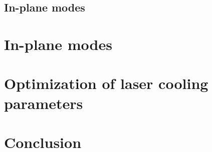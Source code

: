 \documentclass[aps, pra, preprint]{revtex4-1}
\begin{document}
\subsection{In-plane modes}


\section{In-plane modes}
\label{sec:inplanemodes}


\section{Optimization of laser cooling parameters}
\label{sec:optimization}


\section{Conclusion}
\label{sec:conclusion}


\end{document}
